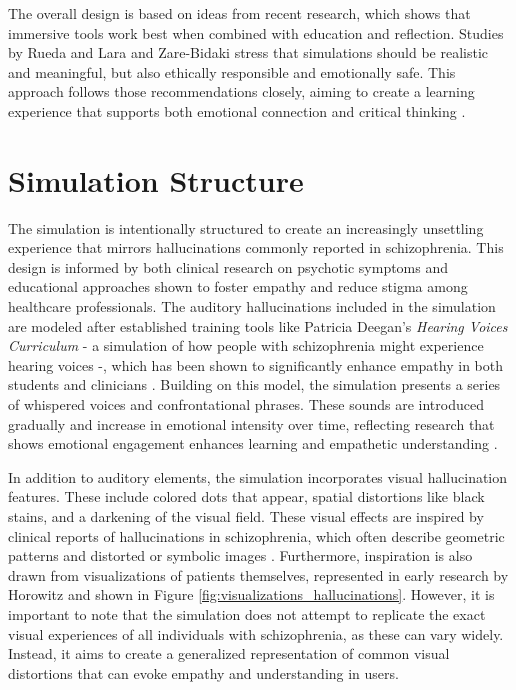 \vspace{1em}
The overall design is based on ideas from recent research, which shows that immersive tools work best when combined with education and reflection. Studies by Rueda and Lara \cite{Rueda2020} and Zare-Bidaki \cite{Zare-Bidaki2022} stress that simulations should be realistic and meaningful, but also ethically responsible and emotionally safe. This approach follows those recommendations closely, aiming to create a learning experience that supports both emotional connection and critical thinking \cite{Rueda2020,Zare-Bidaki2022}.

\section{Simulation Structure}

The simulation is intentionally structured to create an increasingly unsettling experience that mirrors hallucinations commonly reported in schizophrenia. This design is informed by both clinical research on psychotic symptoms and educational approaches shown to foster empathy and reduce stigma among healthcare professionals. The auditory hallucinations included in the simulation are modeled after established training tools like Patricia Deegan’s \textit{Hearing Voices Curriculum} - a simulation of how people with schizophrenia might experience hearing voices -, which has been shown to significantly enhance empathy in both students and clinicians \cite{Hsia2022}. Building on this model, the simulation presents a series of whispered voices and confrontational phrases. These sounds are introduced gradually and increase in emotional intensity over time, reflecting research that shows emotional engagement enhances learning and empathetic understanding \cite{Skoy2016}.

\vspace{1em}

In addition to auditory elements, the simulation incorporates visual hallucination features. These include colored dots that appear, spatial distortions like black stains, and a darkening of the visual field. These visual effects are inspired by clinical reports of hallucinations in schizophrenia, which often describe geometric patterns and distorted or symbolic images \cite{Silverstein2021,Vanommen2019}. Furthermore, inspiration is also drawn from visualizations of patients themselves, represented in early research by Horowitz \cite{Horowitz1964} and shown in Figure \ref{fig:visualizations_hallucinations}. However, it is important to note that the simulation does not attempt to replicate the exact visual experiences of all individuals with schizophrenia, as these can vary widely. Instead, it aims to create a generalized representation of common visual distortions that can evoke empathy and understanding in users.

